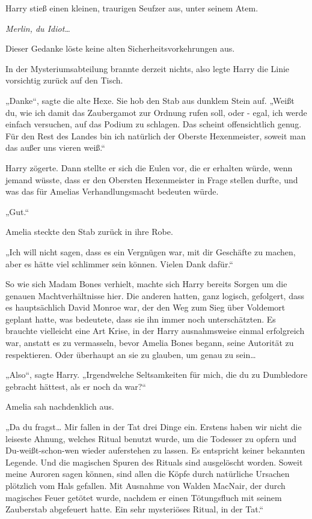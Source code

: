 {Harry stieß einen kleinen, traurigen Seufzer aus, unter seinem Atem.

\emph{Merlin, du Idiot…}

Dieser Gedanke löste keine alten Sicherheitsvorkehrungen aus.

In der Mysteriumsabteilung brannte derzeit nichts, also legte Harry die Linie vorsichtig zurück auf den Tisch.

„Danke“, sagte die alte Hexe. Sie hob den Stab aus dunklem Stein auf. „Weißt du, wie ich damit das Zaubergamot zur Ordnung rufen soll, oder - egal, ich werde einfach versuchen, auf das Podium zu schlagen. Das scheint offensichtlich genug. Für den Rest des Landes bin ich natürlich der Oberste Hexenmeister, soweit man das außer uns vieren weiß.“

Harry zögerte. Dann stellte er sich die Eulen vor, die er erhalten würde, wenn jemand wüsste, dass er den Obersten Hexenmeister in Frage stellen durfte, und was das für Amelias Verhandlungsmacht bedeuten würde.

„Gut.“

Amelia steckte den Stab zurück in ihre Robe.

„Ich will nicht sagen, dass es ein Vergnügen war, mit dir Geschäfte zu machen, aber es hätte viel schlimmer sein können. Vielen Dank dafür.“

So wie sich Madam Bones verhielt, machte sich Harry bereits Sorgen um die genauen Machtverhältnisse hier. Die anderen hatten, ganz logisch, gefolgert, dass es hauptsächlich David Monroe war, der den Weg zum Sieg über Voldemort geplant hatte, was bedeutete, dass sie ihn immer noch unterschätzten. Es brauchte vielleicht eine Art Krise, in der Harry ausnahmsweise einmal erfolgreich war, anstatt es zu vermasseln, bevor Amelia Bones begann, seine Autorität zu respektieren. Oder überhaupt an sie zu glauben, um genau zu sein…

„Also“, sagte Harry. „Irgendwelche Seltsamkeiten für mich, die du zu Dumbledore gebracht hättest, als er noch da war?“

Amelia sah nachdenklich aus.

„Da du fragst… Mir fallen in der Tat drei Dinge ein. Erstens haben wir nicht die leiseste Ahnung, welches Ritual benutzt wurde, um die Todesser zu opfern und Du-weißt-schon-wen wieder auferstehen zu lassen. Es entspricht keiner bekannten Legende. Und die magischen Spuren des Rituals sind ausgelöscht worden. Soweit meine Auroren sagen können, sind allen die Köpfe durch natürliche Ursachen plötzlich vom Hals gefallen. Mit Ausnahme von Walden MacNair, der durch magisches Feuer getötet wurde, nachdem er einen Tötungsfluch mit seinem Zauberstab abgefeuert hatte. Ein sehr mysteriöses Ritual, in der Tat.“

}
